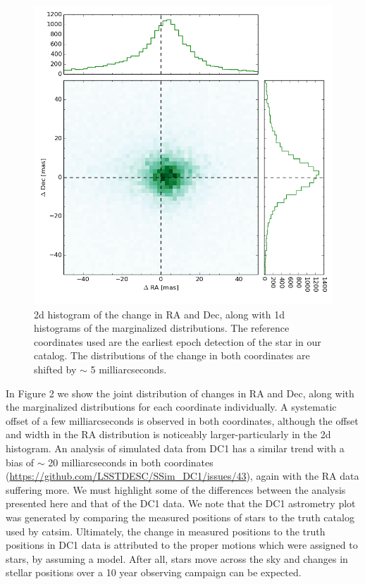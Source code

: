 \documentclass[modern]{aastex61}
\begin{document}
\begin{figure}[h!]
    \includegraphics[width=.9\textwidth]{astrom_ra_dec_internal.png}
    \caption{2d histogram of the change in RA and Dec, along with 1d histograms of the marginalized distributions. The reference coordinates used are the earliest epoch detection of the star in our catalog. The distributions of the change in both coordinates are shifted by $\sim$ 5 milliarcseconds.}
\end{figure}

In Figure 2 we show the joint distribution of changes in RA and Dec, along with the marginalized distributions for each coordinate individually. A systematic offset of a few milliarcseconds is observed in both coordinates, although the offset and width in the RA distribution is noticeably larger-particularly in the 2d histogram. An analysis of simulated data from DC1 has a similar trend with a bias of $\sim$ 20 milliarcseconds in both coordinates (\url{https://github.com/LSSTDESC/SSim_DC1/issues/43}), again with the RA data suffering more. 
We must highlight some of the differences between the analysis presented here and that of the DC1 data. We note that the DC1 astrometry plot was generated by comparing the measured positions of stars to the truth catalog used by catsim. Ultimately, the change in measured positions to the truth positions in DC1 data is attributed to the proper motions which were assigned to stars, by assuming a model. After all, stars move across the sky and changes in stellar positions over a 10 year observing campaign can be expected.  
\end{document}
